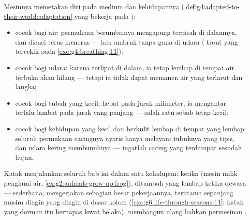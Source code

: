 \begin{proposition}\label{prop:g7:how-animals-breathe:fits}
Mesinnya memetakan diri pada medium dan kehidupannya
(\cref{def:g4:adapted-to-their-world:adaptation} yang bekerja pada
):
\begin{itemize}
  \item {} cocok bagi air: permukaan berumbainya mengapung
        terpisah di dalamnya, dan dicuci terus-menerus --- lalu ambruk
        tanpa guna di udara ( trout yang tercekik pada
        \cref{exo:g4:breathing:11});
  \item {} cocok bagi udara: karena terlipat di dalam, ia tetap
        lembap di tempat air terbuka akan hilang --- tetapi ia tidak
        dapat memanen  air yang terlarut dan langka;
  \item {} cocok bagi tubuh yang kecil: hebat pada jarak
        milimeter, ia mengantar terlalu lambat pada jarak yang panjang
        --- salah satu sebab  tetap kecil;
  \item {} cocok bagi kehidupan yang kecil dan berkulit
        lembap di tempat yang lembap: seluruh permukaan cacingnya
        nyaris hanya melayani tubuhnya yang tipis, dan udara kering
        membunuhnya --- ingatlah cacing  yang terdampar sesudah
        hujan.
\end{itemize}
\end{proposition}
\admitted

\begin{example}\label{ex:g7:how-animals-breathe:frog}
Katak menjalankan seluruh bab ini dalam satu kehidupan:  ketika
 (mesin milik penghuni air,
\cref{ex:g2:animals-grow-up:frog}),  ditambah  yang
lembap ketika dewasa ---  sederhana,  mengerjakan
sebagian besar pekerjaannya, terutama sepanjang musim dingin yang
dingin di dasar kolam
(\cref{exo:g6:life-through-seasons:11}: katak yang dorman itu bernapas
lewat  belaka).  membangun ulang bahkan permesinan
.
\end{example}

